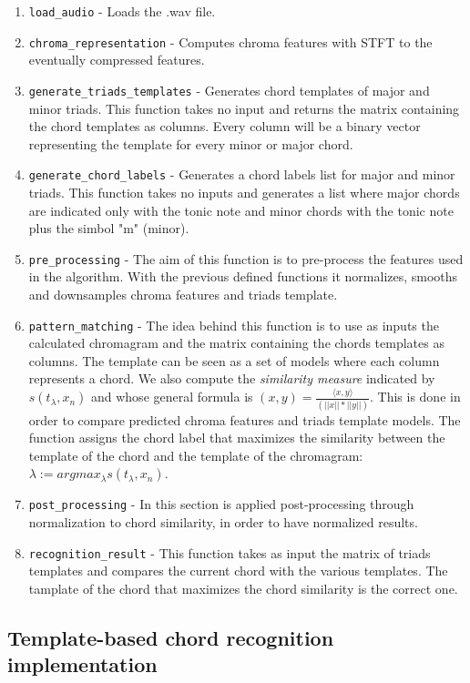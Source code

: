 \documentclass{article}
\begin{document}
\begin{enumerate}
	\item \verb|load_audio| - Loads the .wav file.
	\item \verb|chroma_representation| - Computes chroma features with STFT to the eventually compressed features.
	\item \verb|generate_triads_templates| - Generates chord templates of major and minor triads. This function takes no input and returns the matrix containing the chord templates as columns. Every column will be a binary vector representing the template for every minor or major chord.
	\item \verb|generate_chord_labels| - Generates a chord labels list for major and minor triads.
This function takes no inputs and generates a list where major chords are indicated only with the tonic note and minor chords with the tonic note plus the simbol "m" (minor).
	\item \verb|pre_processing| - The aim of this function is to pre-process the features used in the algorithm. With the previous defined functions it normalizes, smooths and downsamples chroma features and triads template.
	\item \verb|pattern_matching| - 
	The idea behind this function is to use as inputs the calculated chromagram and the matrix containing the chords templates as columns. The template can be seen as a set of models where each column represents a chord. We also compute  the \textit{similarity measure} indicated by $s(t_\lambda,x_n)$ and whose general formula is $(x,y)=\frac{\langle x,y\rangle}{(||x||*||y||)}$. This is done in order to compare predicted chroma features and triads template models.
	The function assigns the chord label that maximizes the similarity between the template of the chord and the template of the chromagram:  $\lambda := argmax_\lambda s(t_\lambda,x_n)$.

	\item \verb|post_processing| - In this section is applied post-processing through normalization to chord similarity, in order to have normalized results.
	\item \verb|recognition_result| - This function takes as input the matrix of triads templates and compares the current chord with the various templates. The tamplate of the chord that maximizes the chord similarity is the correct one. 
\end{enumerate}

\subsection*{Template-based chord recognition implementation}
\end{document}

